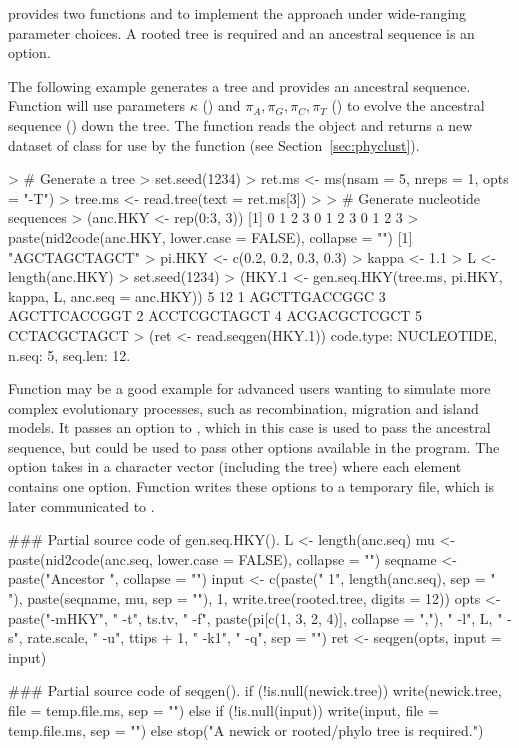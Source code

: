  provides two functions  and
 to implement the 
approach under wide-ranging parameter choices. A rooted tree is required and an
ancestral sequence is an option.

The following example generates a tree and provides an ancestral
sequence. Function  will use
parameters $\kappa$ () and
$\pi_{A}, \pi_{G}, \pi_{C}, \pi_{T}$ ()
to evolve the ancestral sequence () down the tree.
The function  reads the 
object and returns a new dataset of class 
for use by the function  (see Section~\ref{sec:phyclust}).
\begin{Code}
> # Generate a tree
> set.seed(1234)
> ret.ms <- ms(nsam = 5, nreps = 1, opts = "-T")
> tree.ms <- read.tree(text = ret.ms[3])
> 
> # Generate nucleotide sequences
> (anc.HKY <- rep(0:3, 3))
 [1] 0 1 2 3 0 1 2 3 0 1 2 3
> paste(nid2code(anc.HKY, lower.case = FALSE), collapse = "")
[1] "AGCTAGCTAGCT"
> pi.HKY <- c(0.2, 0.2, 0.3, 0.3)
> kappa <- 1.1
> L <- length(anc.HKY)
> set.seed(1234)
> (HKY.1 <- gen.seq.HKY(tree.ms, pi.HKY, kappa, L, anc.seq = anc.HKY))
 5 12
1         AGCTTGACCGGC
3         AGCTTCACCGGT
2         ACCTCGCTAGCT
4         ACGACGCTCGCT
5         CCTACGCTAGCT
> (ret <- read.seqgen(HKY.1))
code.type: NUCLEOTIDE, n.seq: 5, seq.len: 12.
\end{Code}

Function  may be a good example
for advanced users wanting to simulate more complex evolutionary processes, such as recombination,
migration and island models. It passes an option  to
, which in this case is used to pass the ancestral sequence, but could be used to pass other
options available in the  program.
The option  takes in a character vector (including the tree)
where each element contains one  option.
Function  writes these options to
a temporary file, which is later communicated to .
\begin{Code}
### Partial source code of gen.seq.HKY().
        L <- length(anc.seq)
        mu <- paste(nid2code(anc.seq, lower.case = FALSE), collapse = "")
        seqname <- paste("Ancestor  ", collapse = "")
        input <- c(paste(" 1", length(anc.seq), sep = " "), paste(seqname, 
            mu, sep = ""), 1, write.tree(rooted.tree, digits = 12))
        opts <- paste("-mHKY", " -t", ts.tv, " -f", paste(pi[c(1, 
            3, 2, 4)], collapse = ","), " -l", L, " -s", rate.scale, 
            " -u", ttips + 1, " -k1", " -q", sep = "")
        ret <- seqgen(opts, input = input)

### Partial source code of seqgen().
        if (!is.null(newick.tree)) {
            write(newick.tree, file = temp.file.ms, sep = "")
        }
        else if (!is.null(input)) {
            write(input, file = temp.file.ms, sep = "\n")
        }
        else {
            stop("A newick or rooted/phylo tree is required.")
        }
\end{Code}

